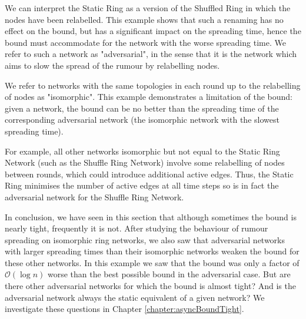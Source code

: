 We can interpret the Static Ring as a version of the Shuffled Ring in which the nodes have been relabelled. This example shows that such a renaming has no effect on the bound, but has a significant impact on the spreading time, hence the bound must accommodate for the network with the worse spreading time. We refer to such a network as "adversarial", in the sense that it is the network which aims to slow the spread of the rumour by relabelling nodes.

We refer to networks with the same topologies in each round up to the relabelling of nodes as "isomorphic". This example demonstrates a limitation of the bound: given a network, the bound can be no better than the spreading time of the corresponding adversarial network (the isomorphic network with the slowest spreading time).

For example, all other networks isomorphic but not equal to the Static Ring Network (such as the Shuffle Ring Network) involve some relabelling of nodes between rounds, which could introduce additional active edges. Thus, the Static Ring minimises the number of active edges at all time steps so is in fact the adversarial network for the Shuffle Ring Network. 

In conclusion, we have seen in this section that although sometimes the bound is nearly tight, frequently it is not. After studying the behaviour of rumour spreading on isomorphic ring networks, we also saw that adversarial networks with larger spreading times than their isomorphic networks weaken the bound for these other networks. In this example we saw that the bound was only a factor of $\mathcal{O}(\log n)$ worse than the best possible bound in the adversarial case. But are there other adversarial networks for which the bound is almost tight? And is the adversarial network always the static equivalent of a given network? We investigate these questions in Chapter \ref{chapter:asyncBoundTight}.